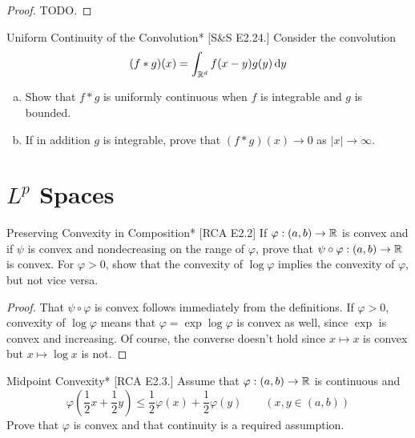 \begin{proof}
    TODO. 
\end{proof}



\begin{problem}{Uniform Continuity of the Convolution}*
    [S\&S E2.24.] Consider the convolution 
    \[
        (f*g)(x) = \int_{\mathbb{R}^d} f(x - y) g(y) \, \mathrm{d}y
    \]
    \begin{enumerate}[(a)]
        \itemsep0em
        \item Show that \(f*g\) is uniformly continuous when \(f\) is integrable and \(g\) is bounded. 
        \item If in addition \(g\) is integrable, prove that \((f*g)(x) \to 0\) as \(|x| \to \infty\). 
    \end{enumerate}
\end{problem}


\newpage
\section{\(L^p\) Spaces}


\begin{problem}{Preserving Convexity in Composition}*
    [RCA E2.2] If \(\varphi : (a, b) \to \mathbb{R}\) is convex and if \(\psi\) is convex and nondecreasing on the range of \(\varphi\), prove that \(\psi \circ \varphi : (a, b) \to \mathbb{R}\) is convex. For \(\varphi > 0\), show that the convexity of \(\log\varphi\) implies the convexity of \(\varphi\), but not vice versa. 
\end{problem}

\begin{proof}
    That \(\psi \circ \varphi\) is convex follows immediately from the definitions. If \(\varphi > 0\), convexity of \(\log\varphi\) means that \(\varphi = \exp \log \varphi\) is convex as well, since \(\exp\) is convex and increasing. Of course, the converse doesn't hold since \(x \mapsto x\) is convex but \(x \mapsto \log x\) is not.
\end{proof}


\begin{problem}{Midpoint Convexity}*
    [RCA E2.3.] Assume that \(\varphi: (a, b) \to \mathbb{R}\) is continuous and 
    \[
        \varphi \left(\frac{1}{2}x + \frac{1}{2}y\right) \leq \frac{1}{2} \varphi(x) + \frac{1}{2}\varphi(y)
        \qquad (x, y \in (a, b))
    \]
    Prove that \(\varphi\) is convex and that continuity is a required assumption. 
\end{problem}

